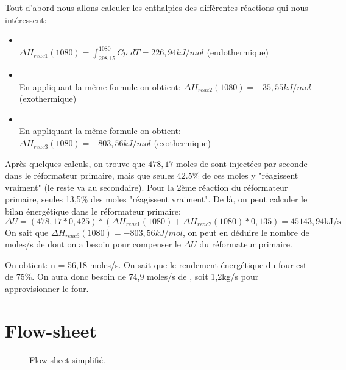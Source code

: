 \documentclass[a4paper, oneside, 12pt]{article}
\begin{document}
Tout d'abord nous allons calculer les enthalpies des différentes réactions qui nous intéressent:

\begin{itemize}
\item{ \\
$\Delta H_{reac1} (1080)=\int_{298.15}^{1080} Cp$ $dT = 226,94 kJ/mol$ (endothermique)}
\item{ \\
En appliquant la même formule on obtient: $\Delta H_{reac2} (1080) = -35,55 kJ/mol$ (exothermique)}
\item{ \\
En appliquant la même formule on obtient: $\Delta H_{reac3} (1080) = -803,56 kJ/mol$ (exothermique)}
\end{itemize}


Après quelques calculs, on trouve que $478,17$ moles de  sont injectées 
par seconde dans le réformateur primaire, mais que seules $42.5\%$ de ces moles 
y "réagissent vraiment" (le reste va au secondaire).
Pour la 2ème réaction du réformateur primaire, seules 13,5\% des moles "réagissent vraiment". 
De là, on peut calculer le bilan énergétique dans le réformateur primaire: 
\[
\Delta U = (478,17 * 0,425) * (\Delta H_{reac1} (1080) + \Delta H_{reac2} (1080) * 0,135)
= 45143,94 \si{\kilo\joule\per\second}
\]
On sait que $\Delta H_{reac3} (1080) = -803,56 kJ/mol$, on peut en déduire le nombre de 
moles/s de  dont on a besoin pour compenser le $\Delta U$ du réformateur primaire. 

On obtient: n = 56,18 moles/s.
On sait que le rendement énergétique du four est de 75\%.
On aura donc besoin de 74,9 moles/s de , soit 1,2kg/s pour approvisionner le four. 


\section{Flow-sheet}
\label{sec:flow}

\begin{figure}
	\begin{center}
		
	\end{center}
	\caption{Flow-sheet simplifié.}
	\label{fig:flow}
\end{figure}

\printbibliography
\end{document}
